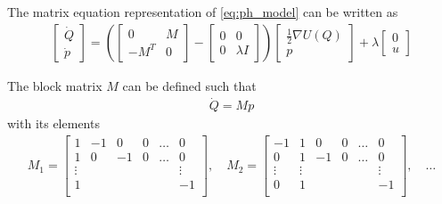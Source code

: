 The matrix equation representation of \autoref{eq:ph_model} can be written as
\begin{gather}
    \begin{bmatrix}
        \dot Q \\ \dot p
    \end{bmatrix} =
    \left(
    \begin{bmatrix}
        0 & M \\ 
        -M^T & 0
    \end{bmatrix} -
    \begin{bmatrix}
        0 & 0 \\
        0 & \lambda I
    \end{bmatrix} \right)
    \begin{bmatrix}
        \frac{1}{2} \nabla U(Q) \\
        p 
    \end{bmatrix}
    + \lambda 
    \begin{bmatrix}
        0 \\ u
    \end{bmatrix}
    \label{eq:matrixeq_ph}
\end{gather}


The block matrix $M$ can be defined such that 
\begin{equation}
\begin{aligned}
    \dot Q = Mp
\end{aligned}
\label{eq:Qmp}   
\end{equation}
with its elements
\begin{gather}
    M_1 = 
    \begin{bmatrix}
        1 & -1 & 0 & 0 & \dots & 0 \\
        1 & 0 & -1 & 0 & \dots & 0 \\
        \vdots & & &  &  & \vdots \\
        1 & & & &  & -1 \\
    \end{bmatrix}, \quad
    M_2 = 
    \begin{bmatrix}
        -1 & 1 & 0 & 0 & \dots & 0 \\
        0 & 1 & -1 & 0 & \dots & 0 \\
        \vdots & \vdots & &  &  & \vdots \\
        0 & 1& & &  & -1 \\
    \end{bmatrix}, \quad \dots
    \label{eq:M_n_def}
\end{gather}
 
